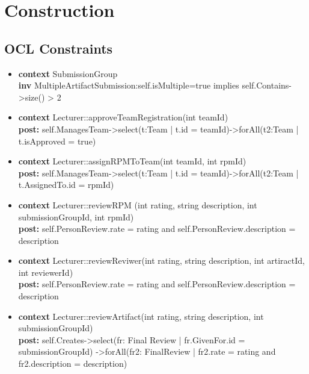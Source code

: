 %
\chapter{Construction}
\label{sec:system}

\section{OCL Constraints}
\begin{itemize}
\itemsep-1.1em 
\item \textbf{context} SubmissionGroup
\\
\textbf{inv} MultipleArtifactSubmission:self.isMultiple=true implies self.Contains->size() > 2

\item \textbf{context} Lecturer::approveTeamRegistration(int teamId)
\\
\textbf{post:} self.ManagesTeam->select(t:Team | t.id = teamId)->forAll(t2:Team | t.isApproved = true)


\item \textbf{context} Lecturer::assignRPMToTeam(int teamId, int rpmId)
\\
\textbf{post:} self.ManagesTeam->select(t:Team | t.id = teamId)->forAll(t2:Team | t.AssignedTo.id = rpmId)


\item \textbf{context} Lecturer::reviewRPM (int rating, string description, int submissionGroupId, int rpmId) 
\\
\textbf{post:} self.PersonReview.rate = rating and self.PersonReview.description = description

\item \textbf{context} Lecturer::reviewReviwer(int rating, string description, int artiractId, int reviewerId)
\\
\textbf{post:} self.PersonReview.rate = rating and self.PersonReview.description = description

\item \textbf{context} Lecturer::reviewArtifact(int rating, string description, int submissionGroupId)
\\
\textbf{post:} self.Creates->select(fr: Final Review | fr.GivenFor.id = submissionGroupId) ->forAll(fr2: FinalReview | fr2.rate = rating and fr2.description = description)


\end{itemize}
